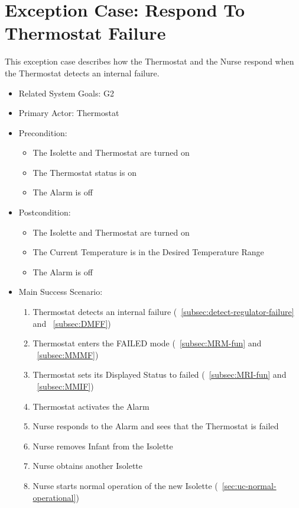 \section{Exception Case: Respond To Thermostat Failure}
\label{sec:ec-respond-failure}

This exception case describes how the Thermostat and the Nurse respond when the Thermostat
detects an internal failure.

\begin{itemize}
\item Related System Goals: G2
\item Primary Actor: Thermostat
\item Precondition:
  \begin{itemize}
  \item The Isolette and Thermostat are turned on
  \item The Thermostat status is on
  \item The Alarm is off
  \end{itemize}
\item Postcondition:
  \begin{itemize}
  \item The Isolette and Thermostat are turned on
  \item The Current Temperature is in the Desired Temperature Range
  \item The Alarm is off
  \end{itemize}
\item Main Success Scenario:
  \begin{enumerate}
  \item Thermostat detects an internal failure (~\ref{subsec:detect-regulator-failure} and ~\ref{subsec:DMFF})
  \item Thermostat enters the FAILED mode (~\ref{subsec:MRM-fun} and ~\ref{subsec:MMMF})
  \item Thermostat sets its Displayed Status to failed (~\ref{subsec:MRI-fun} and ~\ref{subsec:MMIF})
  \item Thermostat activates the Alarm
  \item Nurse responds to the Alarm and sees that the Thermostat is failed
  \item Nurse removes Infant from the Isolette
  \item Nurse obtains another Isolette
  \item Nurse starts normal operation of the new Isolette (~\ref{sec:uc-normal-operational})
  \end{enumerate}
\end{itemize}

